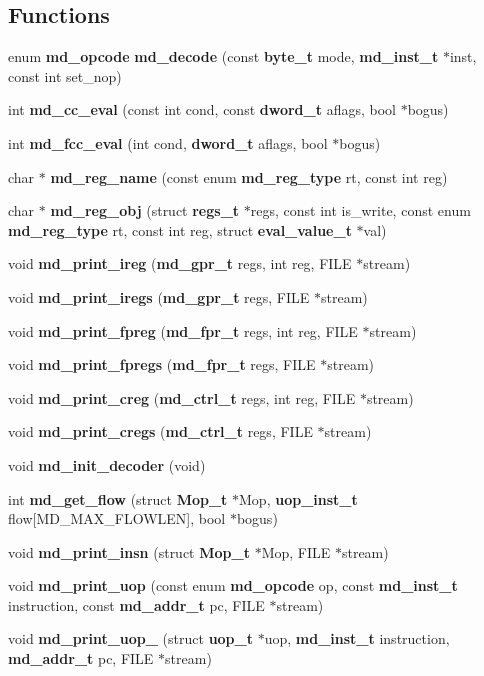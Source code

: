 \subsection*{Functions}
\begin{CompactItemize}
\item 
enum {\bf md\_\-opcode} {\bf md\_\-decode} (const {\bf byte\_\-t} mode, {\bf md\_\-inst\_\-t} $\ast$inst, const int set\_\-nop)
\item 
int {\bf md\_\-cc\_\-eval} (const int cond, const {\bf dword\_\-t} aflags, bool $\ast$bogus)
\item 
int {\bf md\_\-fcc\_\-eval} (int cond, {\bf dword\_\-t} aflags, bool $\ast$bogus)
\item 
char $\ast$ {\bf md\_\-reg\_\-name} (const enum {\bf md\_\-reg\_\-type} rt, const int reg)
\item 
char $\ast$ {\bf md\_\-reg\_\-obj} (struct {\bf regs\_\-t} $\ast$regs, const int is\_\-write, const enum {\bf md\_\-reg\_\-type} rt, const int reg, struct {\bf eval\_\-value\_\-t} $\ast$val)
\item 
void {\bf md\_\-print\_\-ireg} ({\bf md\_\-gpr\_\-t} regs, int reg, FILE $\ast$stream)
\item 
void {\bf md\_\-print\_\-iregs} ({\bf md\_\-gpr\_\-t} regs, FILE $\ast$stream)
\item 
void {\bf md\_\-print\_\-fpreg} ({\bf md\_\-fpr\_\-t} regs, int reg, FILE $\ast$stream)
\item 
void {\bf md\_\-print\_\-fpregs} ({\bf md\_\-fpr\_\-t} regs, FILE $\ast$stream)
\item 
void {\bf md\_\-print\_\-creg} ({\bf md\_\-ctrl\_\-t} regs, int reg, FILE $\ast$stream)
\item 
void {\bf md\_\-print\_\-cregs} ({\bf md\_\-ctrl\_\-t} regs, FILE $\ast$stream)
\item 
void {\bf md\_\-init\_\-decoder} (void)
\item 
int {\bf md\_\-get\_\-flow} (struct {\bf Mop\_\-t} $\ast$Mop, {\bf uop\_\-inst\_\-t} flow[MD\_\-MAX\_\-FLOWLEN], bool $\ast$bogus)
\item 
void {\bf md\_\-print\_\-insn} (struct {\bf Mop\_\-t} $\ast$Mop, FILE $\ast$stream)
\item 
void {\bf md\_\-print\_\-uop} (const enum {\bf md\_\-opcode} op, const {\bf md\_\-inst\_\-t} instruction, const {\bf md\_\-addr\_\-t} pc, FILE $\ast$stream)
\item 
void {\bf md\_\-print\_\-uop\_} (struct {\bf uop\_\-t} $\ast$uop, {\bf md\_\-inst\_\-t} instruction, {\bf md\_\-addr\_\-t} pc, FILE $\ast$stream)

\end{CompactItemize}
